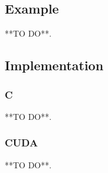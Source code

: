\subsection{Example}
**TO DO**.

\subsection{Implementation}
\subsubsection{C}
**TO DO**.
\subsubsection{CUDA}
**TO DO**.

